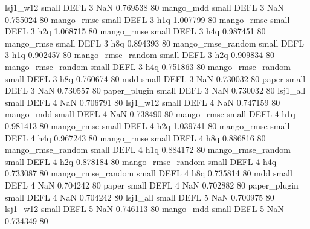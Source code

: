          lsj1_w12      small     DEFL                 3                  NaN 0.769538 80
        mango_mdd      small     DEFL                 3                  NaN 0.755024 80
       mango_rmse      small     DEFL                 3                  h1q 1.007799 80
       mango_rmse      small     DEFL                 3                  h2q 1.068715 80
       mango_rmse      small     DEFL                 3                  h4q 0.987451 80
       mango_rmse      small     DEFL                 3                  h8q 0.894393 80
mango_rmse_random      small     DEFL                 3                  h1q 0.902457 80
mango_rmse_random      small     DEFL                 3                  h2q 0.909834 80
mango_rmse_random      small     DEFL                 3                  h4q 0.751863 80
mango_rmse_random      small     DEFL                 3                  h8q 0.760674 80
              mdd      small     DEFL                 3                  NaN 0.730032 80
            paper      small     DEFL                 3                  NaN 0.730557 80
     paper_plugin      small     DEFL                 3                  NaN 0.730032 80
         lsj1_all      small     DEFL                 4                  NaN 0.706791 80
         lsj1_w12      small     DEFL                 4                  NaN 0.747159 80
        mango_mdd      small     DEFL                 4                  NaN 0.738490 80
       mango_rmse      small     DEFL                 4                  h1q 0.981413 80
       mango_rmse      small     DEFL                 4                  h2q 1.039741 80
       mango_rmse      small     DEFL                 4                  h4q 0.967243 80
       mango_rmse      small     DEFL                 4                  h8q 0.886816 80
mango_rmse_random      small     DEFL                 4                  h1q 0.884172 80
mango_rmse_random      small     DEFL                 4                  h2q 0.878184 80
mango_rmse_random      small     DEFL                 4                  h4q 0.733087 80
mango_rmse_random      small     DEFL                 4                  h8q 0.735814 80
              mdd      small     DEFL                 4                  NaN 0.704242 80
            paper      small     DEFL                 4                  NaN 0.702882 80
     paper_plugin      small     DEFL                 4                  NaN 0.704242 80
         lsj1_all      small     DEFL                 5                  NaN 0.700975 80
         lsj1_w12      small     DEFL                 5                  NaN 0.746113 80
        mango_mdd      small     DEFL                 5                  NaN 0.734349 80
